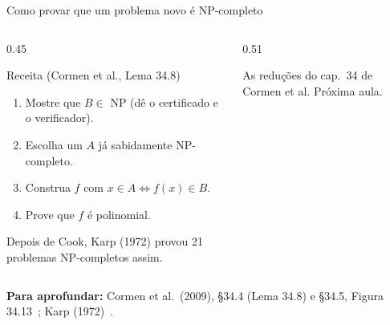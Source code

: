\documentclass[aspectratio=169,xcolor=table]{beamer}
\newcommand{\fonte}[1]{%
  \vfill
  {\tiny\color{gray!55!black}\textbf{Para aprofundar:} #1\par}%
}
\newcommand{\prob}[1]{\textsc{#1}}
\begin{document}
\begin{frame}{Como provar que um problema novo é NP-completo}
  \begin{columns}[T]
    \begin{column}{0.45\textwidth}
      \begin{block}{Receita (Cormen et al., Lema 34.8)}
        \scriptsize
        \begin{enumerate}
          \item Mostre que $B \in$ NP (dê o certificado e o verificador).
          \item Escolha um $A$ já sabidamente NP-completo.
          \item Construa $f$ com $x \in A \iff f(x) \in B$.
          \item Prove que $f$ é polinomial.
        \end{enumerate}
      \end{block}
      \scriptsize
      Depois de Cook, Karp (1972) provou 21 problemas NP-completos assim.
    \end{column}
    \begin{column}{0.51\textwidth}
      \begin{center}
      \end{center}
      {\scriptsize As reduções do cap.~34 de Cormen et al. Próxima aula.\par}
    \end{column}
  \end{columns}
  \fonte{Cormen et al.\ (2009), \S 34.4 (Lema 34.8) e \S 34.5, Figura 34.13~\cite{cormen2009introduction};
    Karp (1972)~\cite{karp1972reducibility}.}
\end{frame}
\end{document}
